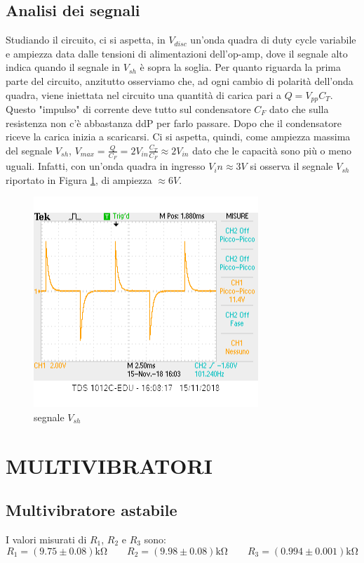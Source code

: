 \documentclass[10pt,a4paper]{article}
\begin{document}
	\subsection{Analisi dei segnali}
		Studiando il circuito, ci si aspetta, in $V_{disc}$ un'onda quadra di duty cycle variabile e ampiezza data dalle tensioni di alimentazioni dell'op-amp, dove il segnale alto indica quando il segnale in $V_{sh}$ è sopra la soglia.
		Per quanto riguarda la prima parte del circuito, anzitutto osserviamo che, ad ogni cambio di polarità dell'onda quadra, viene iniettata nel circuito una quantità di carica pari a $Q=V_{pp} C_T$. Questo "impulso" di corrente deve tutto sul condensatore $C_F$ dato che sulla resistenza non c'è abbastanza ddP per farlo passare.
		Dopo che il condensatore riceve la carica inizia a scaricarsi. Ci si aspetta, quindi, come ampiezza massima del segnale $V_{sh}$, $V_{max}=\frac{Q}{C_F}=2 V_{in} \frac{C_T}{C_F}\approx 2 V_{in} $ dato che le capacità sono più o meno uguali. Infatti, con un'onda quadra in ingresso $V_in\approx3V$ si osserva il segnale $V_{sh}$ riportato in Figura \ref{fig:sample}, di ampiezza $\approx 6V$.
		\begin{figure}
			\centering
			\includegraphics{sample.png}
			\caption{segnale $V_{sh}$}
			\label{fig:sample}
		\end{figure}
	
\clearpage	
\section{ MULTIVIBRATORI }


\subsection{Multivibratore astabile}
I valori misurati di $R_1$, $R_2$ e $R_3$ sono:
\[ R_1 = (9.75\pm 0.08)\si{\kilo\ohm} \qquad  R_2 = (9.98 \pm 0.08)\si{\kilo\ohm} \qquad   R_3 = ( 0.994 \pm0.001 ) \si{\kilo\ohm}\]
\end{document}

